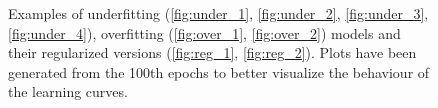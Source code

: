 \documentclass[11pt]{article}
\begin{document}
\begin{figure}[H]

     \caption{Examples of underfitting (\ref{fig:under_1}, \ref{fig:under_2}, \ref{fig:under_3}, \ref{fig:under_4}), overfitting (\ref{fig:over_1}, \ref{fig:over_2}) models and their regularized versions (\ref{fig:reg_1}, \ref{fig:reg_2}). Plots have been generated from the 100th epochs to better visualize the behaviour of the learning curves.}
     \label{fig:screening_cup}
\end{figure}
\end{document}
